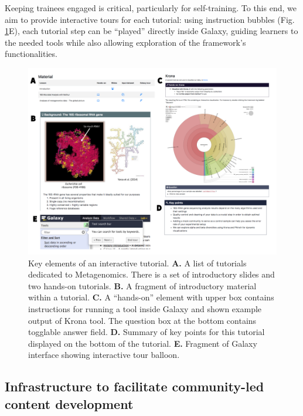 Keeping trainees engaged is critical, particularly for self-training. To this end, we aim to provide interactive tours for each tutorial: using instruction bubbles (Fig. \ref{fig:metagenomics}E), each tutorial step can be “played” directly inside Galaxy, guiding learners to the needed tools while also allowing exploration of the framework’s functionalities.

\begin{figure}
    \centering
    \includegraphics[width=\textwidth]{chapters/images/training-figure-metagenomics.png}
    \caption{ Key elements of an interactive tutorial. \textbf{A.} A list of tutorials dedicated to Metagenomics. There is a set of introductory slides and two hands-on tutorials. \textbf{B.} A fragment of introductory material within a tutorial. \textbf{C.} A “hands-on” element with upper box contains instructions for running a tool inside Galaxy and shown example output of Krona tool. The question box at the bottom contains togglable answer field. \textbf{D.} Summary of key points for this tutorial displayed on the bottom of the tutorial. \textbf{E.} Fragment of Galaxy interface showing interactive tour balloon.  }
    \label{fig:metagenomics}
\end{figure}


\subsection*{Infrastructure to facilitate community-led content development}

